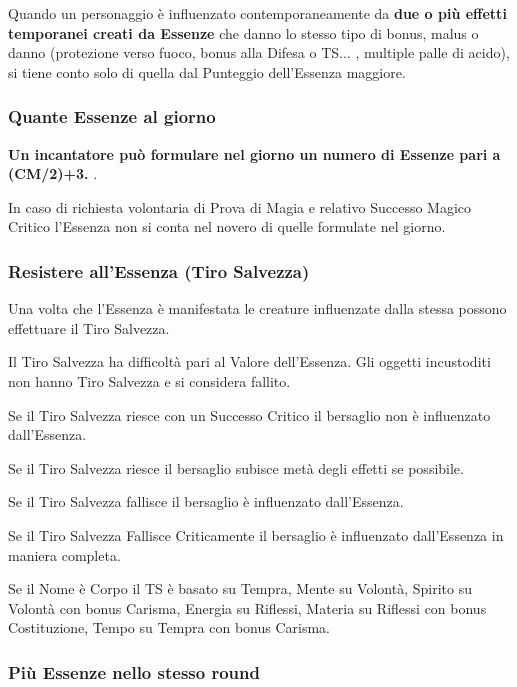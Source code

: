 \documentclass[a4paper,twoside,openany]{book}
\begin{document}
\begin{multicols}{2}
\label{influenzati-da-piu-essenze}

Quando un personaggio è influenzato contemporaneamente da \textbf{due o più effetti temporanei creati da Essenze} che danno lo stesso tipo di bonus, malus o danno (protezione verso fuoco, bonus alla Difesa o TS... , multiple palle di acido), si tiene conto solo di quella dal Punteggio dell'Essenza maggiore.


\subsubsection{Quante Essenze al giorno}


\textbf{Un incantatore può formulare nel giorno un numero di Essenze pari a (CM/2)+3.} .

In caso di richiesta volontaria di Prova di Magia e relativo Successo Magico Critico l'Essenza  non si conta nel novero di quelle formulate nel giorno.


\subsubsection{Resistere all'Essenza (Tiro Salvezza)}

\label{resistere-allessenza-tiro-salvezza}

Una volta che l'Essenza è manifestata le creature influenzate dalla stessa possono effettuare il Tiro Salvezza.

Il Tiro Salvezza ha difficoltà pari al Valore dell'Essenza. Gli oggetti incustoditi non hanno Tiro Salvezza e si considera fallito.

Se il Tiro Salvezza riesce con un Successo Critico il bersaglio non è influenzato dall'Essenza.

Se il Tiro Salvezza riesce il bersaglio subisce metà degli effetti se possibile.

Se il Tiro Salvezza fallisce il bersaglio è influenzato dall'Essenza.

Se il Tiro Salvezza Fallisce Criticamente il bersaglio è influenzato dall'Essenza in maniera completa.

Se il Nome è Corpo il TS è basato su Tempra, Mente su Volontà, Spirito su Volontà con bonus Carisma, Energia su Riflessi, Materia su Riflessi con bonus Costituzione, Tempo su Tempra con bonus Carisma.


\subsubsection{Più Essenze nello stesso round}


\end{multicols}
\end{document}
